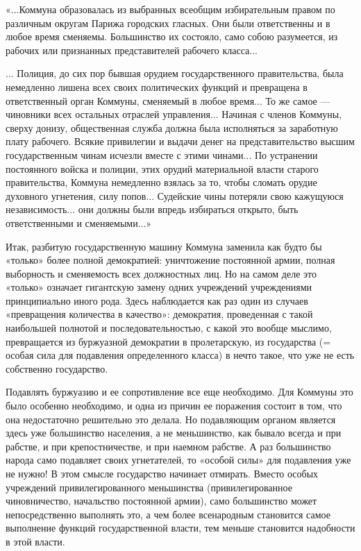 \documentclass[12pt]{article}
\newcommand{\parnum}{(\arabic{parcount})}
\newcounter{parcount}
\newenvironment{parnumbers}{%
  \par%
  \everypar{\noindent \stepcounter{parcount}\marginpar[]{\parnum}}%
}{}
\begin{document}
\begin{parnumbers}
«...Коммуна образовалась из выбранных всеобщим избирательным правом по различным округам Парижа городских гласных. Они были ответственны и в любое время сменяемы. Большинство их состояло, само собою разумеется, из рабочих или признанных представителей рабочего класса...

... Полиция, до сих пор бывшая орудием государственного правительства, была немедленно лишена всех своих политических функций и превращена в ответственный орган Коммуны, сменяемый в любое время... То же самое — чиновники всех остальных отраслей управления... Начиная с членов Коммуны, сверху донизу, общественная служба должна была исполняться за заработную плату рабочего. Всякие привилегии и выдачи денег на представительство высшим государственным чинам исчезли вместе с этими чинами... По устранении постоянного войска и полиции, этих орудий материальной власти старого правительства, Коммуна немедленно взялась за то, чтобы сломать орудие духовного угнетения, силу попов... Судейские чины потеряли свою кажущуюся независимость... они должны были впредь избираться открыто, быть ответственными и сменяемыми...»

Итак, разбитую государственную машину Коммуна заменила как будто бы «только» более полной демократией: уничтожение постоянной армии, полная выборность и сменяемость всех должностных лиц. Но на самом деле это «только» означает гигантскую замену одних учреждений учреждениями принципиально иного рода. Здесь наблюдается как раз один из случаев «превращения количества в качество»: демократия, проведенная с такой наибольшей полнотой и последовательностью, с какой это вообще мыслимо, превращается из буржуазной демократии в пролетарскую, из государства (= особая сила для подавления определенного класса) в нечто такое, что уже не есть собственно государство.

Подавлять буржуазию и ее сопротивление все еще необходимо. Для Коммуны это было особенно необходимо, и одна из причин ее поражения состоит в том, что она недостаточно решительно это делала. Но подавляющим органом является здесь уже большинство населения, а не меньшинство, как бывало всегда и при рабстве, и при крепостничестве, и при наемном рабстве. А раз большинство народа само подавляет своих угнетателей, то «особой силы» для подавления уже не нужно! В этом смысле государство начинает отмирать. Вместо особых учреждений привилегированного меньшинства (привилегированное чиновничество, начальство постоянной армии), само большинство может непосредственно выполнять это, а чем более всенародным становится самое выполнение функций государственной власти, тем меньше становится надобности в этой власти.


\end{parnumbers}
\end{document}

